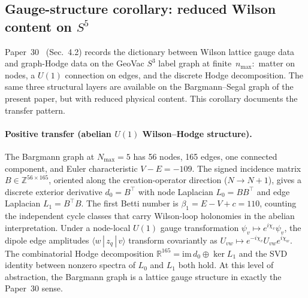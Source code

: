 \documentclass[twocolumn,pra,amsmath,amssymb,superscriptaddress]{revtex4-2}
\begin{document}
\subsection{Gauge-structure corollary: reduced Wilson content on $S^5$}
\label{sec:gauge-structure-reduced}

Paper~30~\cite{paper30} (Sec.~4.2) records the dictionary between
Wilson lattice gauge data and graph-Hodge data on the GeoVac $S^3$
label graph at finite~$n_{\max}$:\ matter on nodes, a $U(1)$
connection on edges, and the discrete Hodge decomposition.
The same three structural layers are available on the
Bargmann--Segal graph of the present paper, but with reduced
physical content.  This corollary documents the transfer pattern.

\paragraph{Positive transfer (abelian $U(1)$ Wilson--Hodge
structure).}
The Bargmann graph at $N_{\max} = 5$ has 56 nodes, 165 edges, one
connected component, and Euler characteristic $V - E = -109$.  The
signed incidence matrix $B\in\mathbb{Z}^{56\times 165}$, oriented
along the creation-operator direction ($N\to N+1$), gives a discrete
exterior derivative $d_0 = B^\top$ with node Laplacian $L_0 = BB^\top$
and edge Laplacian $L_1 = B^\top B$.  The first Betti number is
$\beta_1 = E - V + c = 110$, counting the independent cycle classes
that carry Wilson-loop holonomies in the abelian interpretation.
Under a node-local $U(1)$ gauge transformation
$\psi_v \mapsto e^{i\chi_v}\psi_v$, the dipole edge amplitudes
$\langle w\,|\,z_q\,|\,v\rangle$ transform covariantly as
$U_{vw}\mapsto e^{-i\chi_v}U_{vw}e^{i\chi_w}$.  The combinatorial
Hodge decomposition
$\mathbb{R}^{165} = \mathrm{im}\,d_0 \oplus \ker L_1$ and the
SVD identity between nonzero spectra of $L_0$ and $L_1$ both hold.
At this level of abstraction, the Bargmann graph is a lattice
gauge structure in exactly the Paper~30 sense.
\end{document}
